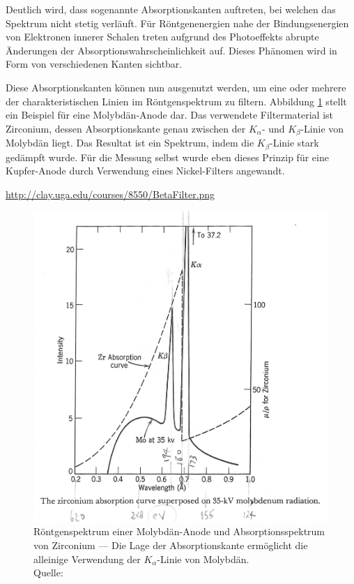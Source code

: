 			Deutlich wird, dass sogenannte Absorptionskanten auftreten, bei welchen das Spektrum nicht stetig verläuft.
			Für Röntgenenergien nahe der Bindungsenergien von Elektronen innerer Schalen treten aufgrund des Photoeffekts abrupte Änderungen der Absorptionswahrscheinlichkeit auf.
			Dieses Phänomen wird in Form von verschiedenen Kanten sichtbar.

			Diese Absorptionskanten können nun ausgenutzt werden, um eine oder mehrere der charakteristischen Linien im Röntgenspektrum zu filtern.
			Abbildung \ref{fig:x-ray-filter} stellt ein Beispiel für eine Molybdän-Anode dar.
			Das verwendete Filtermaterial ist Zirconium, dessen Absorptionskante genau zwischen der $K_\alpha$- und $K_\beta$-Linie von Molybdän liegt.
			Das Resultat ist ein Spektrum, indem die $K_\beta$-Linie stark gedämpft wurde.
			Für die Messung selbst wurde eben dieses Prinzip für eine Kupfer-Anode durch Verwendung eines Nickel-Filters angewandt.

			\url{http://clay.uga.edu/courses/8550/BetaFilter.png}
			\begin{figure}[htb]
				\centering
				\includegraphics[scale=1]{images/BetaFilter.png}
				\caption{Röntgenspektrum einer Molybdän-Anode und Absorptionsspektrum von Zirconium --- Die Lage der Absorptionskante ermöglicht die alleinige Verwendung der $K_\alpha$-Linie von Molybdän. \\ Quelle: }
				\label{fig:x-ray-filter}
			\end{figure}
		
